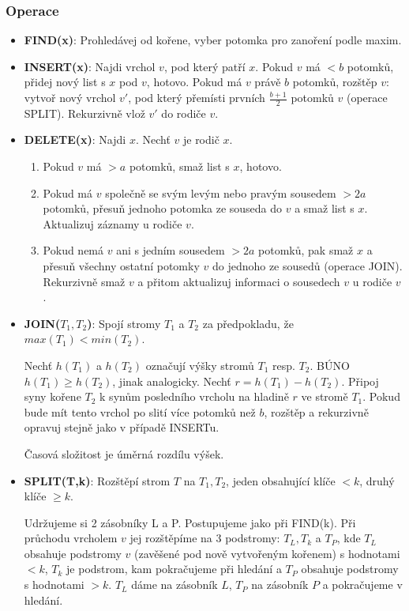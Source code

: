 \documentclass[11pt]{report} %
\numberwithin{equation}{section}
\begin{document}
\subsubsection{Operace}
\begin{itemize}
	
	
	\item \textbf{FIND(x)}:
	Prohledávej od kořene, vyber potomka pro zanoření podle maxim.
	
	\item \textbf{INSERT(x)}:
	Najdi vrchol $v$, pod který patří $x$. Pokud $v$ má $< b$ potomků, přidej nový list s $x$ pod $v$, hotovo. Pokud má $v$ právě $b$ potomků, rozštěp $v$: vytvoř nový vrchol $v'$, pod který přemísti prvních $\frac{b+1}{2}$ potomků $v$ (operace SPLIT). Rekurzivně vlož $v'$ do rodiče $v$.

	\item \textbf{DELETE(x)}:
	Najdi $x$. Nechť $v$ je rodič $x$. 
	\begin{enumerate}
	
	
	\item Pokud $v$ má $> a$ potomků, smaž list s $x$, hotovo. 
	\item Pokud má $v$ společně se svým levým nebo pravým sousedem $> 2a$ potomků, přesuň jednoho potomka ze souseda do $v$ a smaž list s $x$. Aktualizuj záznamy u rodiče $v$.
	\item Pokud nemá $v$ ani s jedním sousedem $> 2a$ potomků, pak smaž $x$ a přesuň všechny ostatní potomky $v$ do jednoho ze sousedů (operace JOIN). Rekurzivně smaž $v$ a přitom aktualizuj informaci o sousedech $v$ u rodiče $v$.
	\end{enumerate}	

	\item \textbf{JOIN($T_1, T_2$)}:
	Spojí stromy $T_1$ a $T_2$ za předpokladu, že $max(T_1) < min(T_2)$.

	Nechť $h(T_1)$ a $h(T_2)$ označují výšky stromů $T_1$ resp. $T_2$. BÚNO $h(T_1) \geq h(T_2)$, jinak analogicky. Nechť $r = h(T_1) - h(T_2)$. Připoj syny kořene $T_2$ k synům posledního vrcholu na hladině $r$ ve stromě $T_1$. Pokud bude mít tento vrchol po slití více potomků než $b$, rozštěp a rekurzivně opravuj stejně jako v případě INSERTu.
	
	Časová složitost je úměrná rozdílu výšek.

	\item \textbf{SPLIT(T,k)}:
	Rozštěpí strom $T$ na $T_1, T_2$, jeden obsahující klíče $< k$, druhý klíče $\geq k$.
	
	Udržujeme si 2 zásobníky L a P. Postupujeme jako při FIND(k). Při průchodu vrcholem $v$ jej rozštěpíme na 3 podstromy: $T_L, T_k$ a $T_P$, kde $T_L$ obsahuje podstromy $v$ (zavěšené pod nově vytvořeným kořenem) s hodnotami $< k$, $T_k$ je podstrom, kam pokračujeme při hledání a $T_P$ obsahuje podstromy s hodnotami $> k$. $T_L$ dáme na zásobník $L$, $T_P$ na zásobník $P$ a pokračujeme v hledání.
	

\end{itemize}
\end{document}
